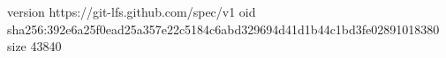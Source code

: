 version https://git-lfs.github.com/spec/v1
oid sha256:392e6a25f0ead25a357e22c5184c6abd329694d41d1b44c1bd3fe02891018380
size 43840

